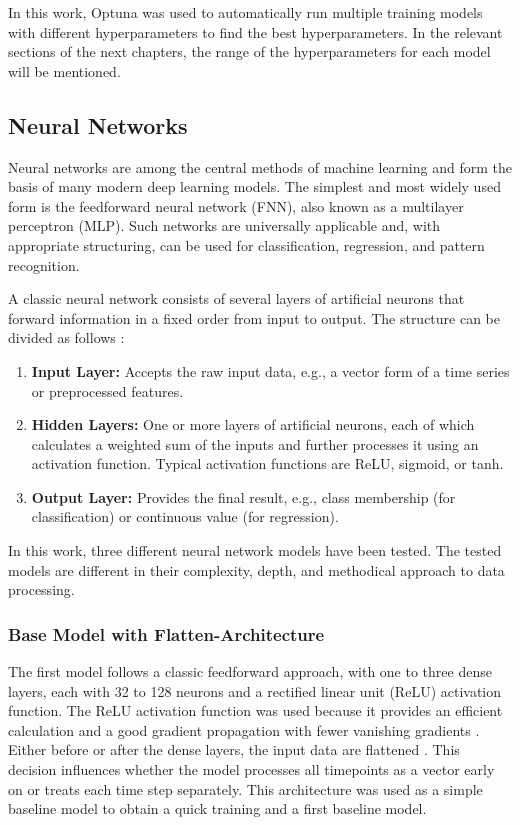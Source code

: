 In this work, Optuna was used to automatically run multiple training models with different hyperparameters to find the best hyperparameters.
In the relevant sections of the next chapters, the range of the hyperparameters for each model will be mentioned.

\subsection{Neural Networks}
\label{chap:nn}

Neural networks are among the central methods of machine learning and form the basis of many modern deep learning models.
The simplest and most widely used form is the feedforward neural network (FNN), also known as a multilayer perceptron (MLP).
Such networks are universally applicable and, with appropriate structuring, can be used for classification, regression, and pattern recognition.

A classic neural network consists of several layers of artificial neurons that forward information in a fixed order from input to output.
The structure can be divided as follows \cite{nn-basics}:

\begin{enumerate}
    \item \textbf{Input Layer:} Accepts the raw input data, e.g., a vector form of a time series or preprocessed features.
    \item \textbf{Hidden Layers:} One or more layers of artificial neurons, each of which calculates a weighted sum of the inputs and further processes it using an activation function.
    Typical activation functions are ReLU, sigmoid, or tanh.
    \item \textbf{Output Layer:} Provides the final result, e.g., class membership (for classification) or continuous value (for regression).
\end{enumerate}

In this work, three different neural network models have been tested.
The tested models are different in their complexity, depth, and methodical approach to data processing.

\subsubsection{Base Model with Flatten-Architecture}

The first model follows a classic feedforward approach, with one to three dense layers, each with 32 to 128 neurons and a rectified linear unit (ReLU) activation function.
The ReLU activation function was used because it provides an efficient calculation and a good gradient propagation with fewer vanishing gradients \cite{springer-ml-basics}.
Either before or after the dense layers, the input data are flattened \cite{keras-flatten}.
This decision influences whether the model processes all timepoints as a vector early on or treats each time step separately.
This architecture was used as a simple baseline model to obtain a quick training and a first baseline model.

